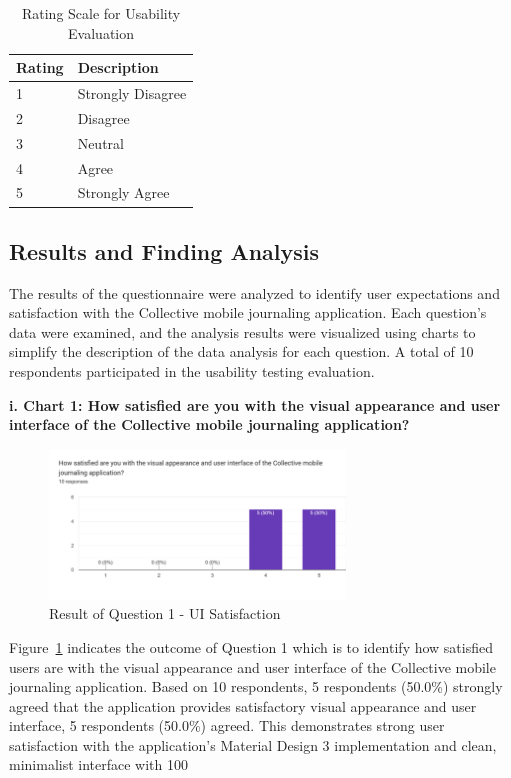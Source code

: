 \begin{table}[H]
\centering
\caption{Rating Scale for Usability Evaluation}
\label{tab:rating-scale}
\begin{tabular}{|p{1.5cm}|p{12.5cm}|}
\hline
\textbf{Rating} & \textbf{Description} \\
\hline
1 & Strongly Disagree \\
\hline
2 & Disagree \\
\hline
3 & Neutral \\
\hline
4 & Agree \\
\hline
5 & Strongly Agree \\
\hline
\end{tabular}
\end{table}

\subsection{Results and Finding Analysis}\label{sec:resultsFindings}

The results of the questionnaire were analyzed to identify user expectations and satisfaction with the Collective mobile journaling application. Each question's data were examined, and the analysis results were visualized using charts to simplify the description of the data analysis for each question. A total of 10 respondents participated in the usability testing evaluation.

\textbf{i. Chart 1: How satisfied are you with the visual appearance and user interface of the Collective mobile journaling application?}

\begin{figure}[H]
\centering
\includegraphics[width=0.7\textwidth]{files/imgs/survey/chart1_ui_satisfaction.png}
\caption{Result of Question 1 - UI Satisfaction}
\label{fig:chart1-ui}
\end{figure}

Figure~\ref{fig:chart1-ui} indicates the outcome of Question 1 which is to identify how satisfied users are with the visual appearance and user interface of the Collective mobile journaling application. Based on 10 respondents, 5 respondents (50.0\%) strongly agreed that the application provides satisfactory visual appearance and user interface, 5 respondents (50.0\%) agreed. This demonstrates strong user satisfaction with the application's Material Design 3 implementation and clean, minimalist interface with 100%

